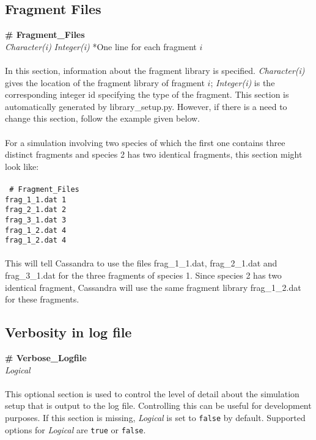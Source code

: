 \subsection{Fragment Files}\label{sec:Fragment_Files}
{\bf \# Fragment\_Files} \\
{\it Character(i)} {\it Integer(i)} *One line for each fragment $i$ \\ \\
%
In this section, information about the fragment library is specified. {\it Character(i)} gives
the location of the fragment library of fragment $i$; {\it Integer(i)} is the
corresponding integer id specifying the type of the fragment. This section is automatically
generated by library\_setup.py. However, if there is a need to change this section, follow the example
given below. \\ \\
%
For a simulation involving two species of which the first one contains three distinct fragments and species 2
has two identical fragments, this section might look like: \\ \\
%
\texttt{
\# Fragment\_Files  \\
frag\_1\_1.dat 1 \\
frag\_2\_1.dat 2 \\
frag\_3\_1.dat 3 \\
frag\_1\_2.dat 4 \\
frag\_1\_2.dat 4 \\ \\
}
%
This will tell Cassandra to use the files frag\_1\_1.dat, frag\_2\_1.dat and frag\_3\_1.dat for the three
fragments of species 1. Since species 2 has two identical fragment, Cassandra will use the same
fragment library frag\_1\_2.dat for these fragments. 

%
%

\subsection{Verbosity in log file}\label{sec:Verbose_Logfile}
{\bf \# Verbose\_Logfile} \\
{\it Logical} \\ \\
%
This optional section is used to control the level of detail about the simulation
setup that is output to the log file. 
Controlling this can be useful for development purposes. 
If this section is missing, {\it Logical} is set to {\tt false} by default. 
Supported options for {\it Logical} are {\tt true} or {\tt false}. \\ \\
%
%
%

